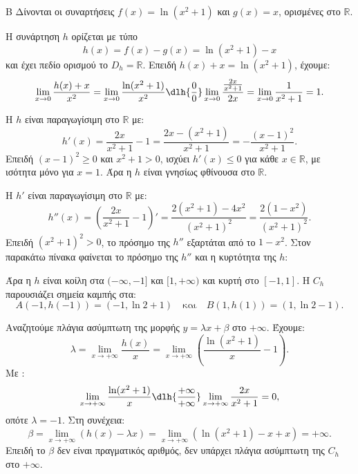 \begin{thema}{Β}
Δίνονται οι συναρτήσεις $f(x) = \ln(x^2+1)$ και $g(x) = x$, ορισμένες στο $\mathbb{R}$.
\begin{erwthma}
\item Η συνάρτηση $h$ ορίζεται με τύπο
\[ h(x)=f(x)-g(x)=\ln(x^2+1)-x \]
και έχει πεδίο ορισμού το $D_h=\mathbb{R}$.
Επειδή $h(x)+x=\ln(x^2+1)$, έχουμε:
\[ \lim_{x \to 0} \frac{h(x)+x}{x^2} = \lim_{x \to 0} \frac{\ln(x^2+1)}{x^2} \dlh{\frac{0}{0}} \lim_{x \to 0} \frac{\frac{2x}{x^2+1}}{2x} = \lim_{x \to 0} \frac{1}{x^2+1} = 1. \]

\item Η $h$ είναι παραγωγίσιμη στο $\mathbb{R}$ με:
\[ h'(x) = \frac{2x}{x^2+1} - 1 = \frac{2x-(x^2+1)}{x^2+1} = -\frac{(x-1)^2}{x^2+1}. \]
Επειδή $(x-1)^2\ge 0$ και $x^2+1>0$, ισχύει $h'(x)\le 0$ για κάθε $x\in\mathbb{R}$, με ισότητα μόνο για $x=1$.
Άρα η $h$ είναι γνησίως φθίνουσα στο $\mathbb{R}$.

\item Η $h'$ είναι παραγωγίσιμη στο $\mathbb{R}$ με:
\[ h''(x)=\left(\frac{2x}{x^2+1}-1\right)'=\frac{2(x^2+1)-4x^2}{(x^2+1)^2}=\frac{2(1-x^2)}{(x^2+1)^2}. \]
Επειδή $(x^2+1)^2>0$, το πρόσημο της $h''$ εξαρτάται από το $1-x^2$.
Στον παρακάτω πίνακα φαίνεται το πρόσημο της $h''$ και η κυρτότητα της $h$:
\begin{center}
\end{center}
Άρα η $h$ είναι κοίλη στα $(-\infty,-1]$ και $[1,+\infty)$ και κυρτή στο $[-1,1]$.
Η $C_h$ παρουσιάζει σημεία καμπής στα:
\[ A(-1,h(-1))=(-1,\ln2+1) \quad \text{και} \quad B(1,h(1))=(1,\ln2-1). \]

\item Αναζητούμε πλάγια ασύμπτωτη της μορφής $y=\lambda x+\beta$ στο $+\infty$.
Έχουμε:
\[ \lambda = \lim_{x\to+\infty}\frac{h(x)}{x} = \lim_{x\to+\infty}\left(\frac{\ln(x^2+1)}{x}-1\right). \]
Με :
\[ \lim_{x\to+\infty}\frac{\ln(x^2+1)}{x} \dlh{\frac{+\infty}{+\infty}} \lim_{x\to+\infty}\frac{2x}{x^2+1}=0, \]
οπότε $\lambda=-1$.
Στη συνέχεια:
\[ \beta=\lim_{x\to+\infty}(h(x)-\lambda x)=\lim_{x\to+\infty}(\ln(x^2+1)-x+x)=+\infty. \]
Επειδή το $\beta$ δεν είναι πραγματικός αριθμός, δεν υπάρχει πλάγια ασύμπτωτη της $C_h$ στο $+\infty$.
\end{erwthma}
\end{thema}
